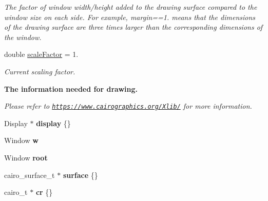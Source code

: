 \begin{DoxyCompactItemize}
\begin{DoxyCompactList}\small\item\em The factor of window width/height added to the drawing surface compared to the window size on each side. For example, margin==1. means that the dimensions of the drawing surface are three times larger than the corresponding dimensions of the window. \end{DoxyCompactList}\item 
double \hyperlink{structGraphics_aa2df2655edc4bc0ea99147b8daab1dd0}{scale\+Factor} = 1.\hypertarget{structGraphics_aa2df2655edc4bc0ea99147b8daab1dd0}{}\label{structGraphics_aa2df2655edc4bc0ea99147b8daab1dd0}

\begin{DoxyCompactList}\small\item\em Current scaling factor. \end{DoxyCompactList}\end{DoxyCompactItemize}
\begin{Indent}{\bf The information needed for drawing.}\par
{\em Please refer to \href{https://www.cairographics.org/Xlib/}{\tt https\+://www.\+cairographics.\+org/\+Xlib/} for more information. }\begin{DoxyCompactItemize}
\item 
Display $\ast$ {\bfseries display} \{\}\hypertarget{structGraphics_a371a8ff8f34c4d96a259269f5662a614}{}\label{structGraphics_a371a8ff8f34c4d96a259269f5662a614}

\item 
Window {\bfseries w}\hypertarget{structGraphics_ad9ab0f65602f4d2fbe99e91a3ec4da5b}{}\label{structGraphics_ad9ab0f65602f4d2fbe99e91a3ec4da5b}

\item 
Window {\bfseries root}\hypertarget{structGraphics_a1cc34948659fb569cc66b2ad9b197637}{}\label{structGraphics_a1cc34948659fb569cc66b2ad9b197637}

\item 
cairo\+\_\+surface\+\_\+t $\ast$ {\bfseries surface} \{\}\hypertarget{structGraphics_a6f12e34cca00e2b761666a26d988897f}{}\label{structGraphics_a6f12e34cca00e2b761666a26d988897f}

\item 
cairo\+\_\+t $\ast$ {\bfseries cr} \{\}\hypertarget{structGraphics_ad2025f409fd7c00944183dd97fcc039f}{}\label{structGraphics_ad2025f409fd7c00944183dd97fcc039f}

\end{DoxyCompactItemize}
\end{Indent}
